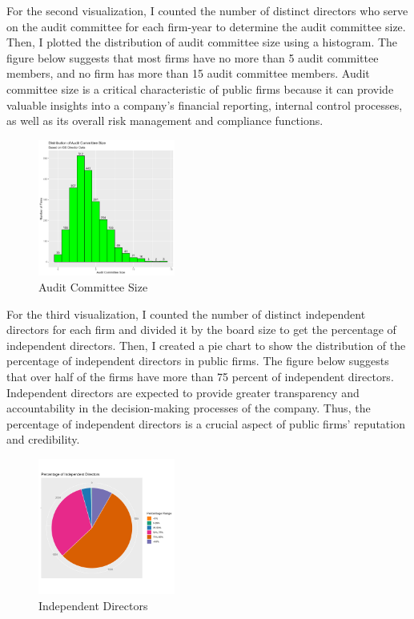 \documentclass{article}
\begin{document}
For the second visualization, I counted the number of distinct directors who serve on the audit committee for each firm-year to determine the audit committee size. Then, I plotted the distribution of audit committee size using a histogram. The figure below suggests that most firms have no more than 5 audit committee members, and no firm has more than 15 audit committee members. Audit committee size is a critical characteristic of public firms because it can provide valuable insights into a company's financial reporting, internal control processes, as well as its overall risk management and compliance functions.
\begin{figure}[htbp]
  \centering
  \includegraphics[width=0.4\textwidth]{PS6b_Davila.png}
  \caption{Audit Committee Size}
  \label{fig:myimage2}
\end{figure} 

For the third visualization, I counted the number of distinct independent directors for each firm and divided it by the board size to get the percentage of independent directors. Then, I created a pie chart to show the distribution of the percentage of independent directors in public firms. The figure below suggests that over half of the firms have more than 75 percent of independent directors. Independent directors are expected to provide greater transparency and accountability in the decision-making processes of the company. Thus, the percentage of independent directors is a crucial aspect of public firms' reputation and credibility.
\begin{figure}[htbp]
  \centering
  \includegraphics[width=0.4\textwidth]{PS6c_Davila.png}
  \caption{Independent Directors}
  \label{fig:myimage3}
\end{figure} 
\end{document}
